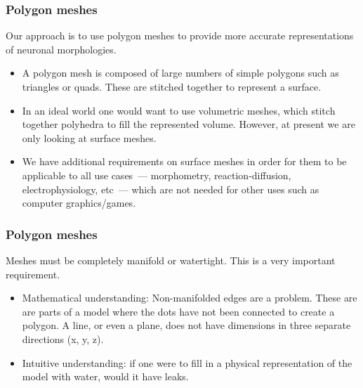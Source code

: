 \documentclass{beamer}
\begin{document}
\begin{frame}
\frametitle{Polygon meshes}

Our approach is to use polygon meshes to provide more accurate
representations of neuronal morphologies.

\pause

\begin{itemize}
\item A polygon mesh is composed of large numbers of simple polygons
  such as triangles or quads. These are stitched together to represent
  a surface.
\pause
\item In an ideal world one would want to use volumetric meshes, which
  stitch together polyhedra to fill the represented volume. However,
  at present we are only looking at surface meshes.
\pause
\item We have additional requirements on surface meshes in order for
  them to be applicable to all use cases~--- morphometry,
  reaction-diffusion, electrophysiology, etc~--- which are not needed
  for other uses such as computer graphics/games.
\end{itemize}

\end{frame}

\begin{frame}
\frametitle{Polygon meshes}

Meshes must be completely manifold or watertight. This is a very
important requirement.
\pause

\begin{itemize}
\item Mathematical understanding: Non-manifolded edges are a
  problem. These are are parts of a model where the dots have not been
  connected to create a polygon. A line, or even a plane, does not have
  dimensions in three separate directions (x, y, z).
\pause
\item Intuitive understanding: if one were to fill in a physical
  representation of the model with water, would it have leaks.
\end{itemize}

\end{frame}

\begin{frame}
  \printbibliography
\end{frame}
\end{document}
